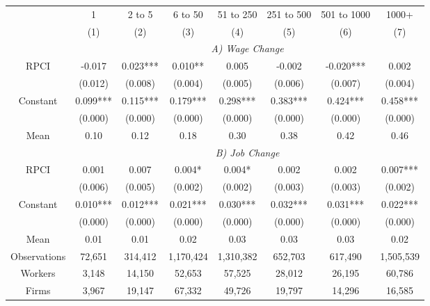 \begin{tabular}{cccccccc}
\toprule
\toprule
      & 1     & 2 to 5 & 6 to 50 & 51 to 250 & 251 to 500 & 501 to 1000 & 1000+ \\
      & (1)   & (2)   & (3)   & (4)   & (5)   & (6)   & (7) \\
\cmidrule{2-8}      & \multicolumn{7}{c}{\textit{A) Wage Change}} \\
\midrule
RPCI  & -0.017 & 0.023*** & 0.010** & 0.005 & -0.002 & -0.020*** & 0.002 \\
      & (0.012) & (0.008) & (0.004) & (0.005) & (0.006) & (0.007) & (0.004) \\
Constant & 0.099*** & 0.115*** & 0.179*** & 0.298*** & 0.383*** & 0.424*** & 0.458*** \\
      & (0.000) & (0.000) & (0.000) & (0.000) & (0.000) & (0.000) & (0.000) \\
Mean  & 0.10  & 0.12  & 0.18  & 0.30  & 0.38  & 0.42  & 0.46 \\
\cmidrule{2-8}      & \multicolumn{7}{c}{\textit{B) Job Change}} \\
\midrule
RPCI  & 0.001 & 0.007 & 0.004* & 0.004* & 0.002 & 0.002 & 0.007*** \\
      & (0.006) & (0.005) & (0.002) & (0.002) & (0.003) & (0.003) & (0.002) \\
Constant & 0.010*** & 0.012*** & 0.021*** & 0.030*** & 0.032*** & 0.031*** & 0.022*** \\
      & (0.000) & (0.000) & (0.000) & (0.000) & (0.000) & (0.000) & (0.000) \\
Mean  & 0.01  & 0.01  & 0.02  & 0.03  & 0.03  & 0.03  & 0.02 \\
Observations & 72,651 & 314,412 & 1,170,424 & 1,310,382 & 652,703 & 617,490 & 1,505,539 \\
Workers & 3,148 & 14,150 & 52,653 & 57,525 & 28,012 & 26,195 & 60,786 \\
Firms & 3,967 & 19,147 & 67,332 & 49,726 & 19,797 & 14,296 & 16,585 \\
\bottomrule
\bottomrule
\end{tabular}%
